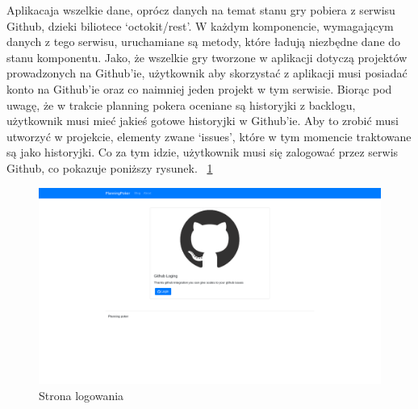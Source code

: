 Aplikacaja wszelkie dane, oprócz danych na temat stanu gry pobiera z serwisu Github,
dzieki biliotece `octokit/rest'.  W każdym komponencie, wymagającym danych z tego serwisu,
uruchamiane są metody, które ładują niezbędne dane do stanu komponentu.
Jako, że wszelkie gry tworzone w aplikacji dotyczą projektów prowadzonych na Github'ie,
użytkownik aby skorzystać z aplikacji musi posiadać konto na Github'ie oraz co naimniej jeden projekt
w tym serwisie. Biorąc pod uwagę, że w trakcie planning pokera oceniane są historyjki z backlogu,
użytkownik musi mieć jakieś gotowe historyjki w Github'ie. Aby to zrobić musi utworzyć w projekcie,
elementy zwane `issues', które w tym momencie traktowane są jako historyjki.
Co za tym idzie, użytkownik musi się zalogować przez serwis Github, co pokazuje poniższy rysunek.
~\ref{rys:login} 

\begin{figure}
	\centering\includegraphics[width=.7\textwidth]{img/GitLogin}
	\caption{Strona logowania}\label{rys:login}%
\end{figure}

